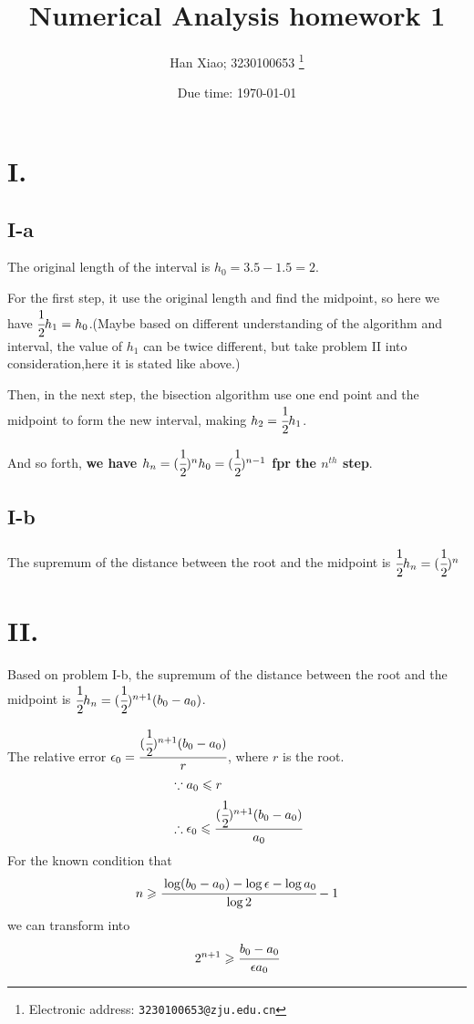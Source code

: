 \documentclass[a4paper]{article}
\begin{document}
\title{Numerical Analysis homework 1}

\author{Han Xiao; 3230100653
  \thanks{Electronic address: \texttt{3230100653@zju.edu.cn}}}


\date{Due time: \today}

\maketitle


\section*{I.}

\subsection*{I-a}
The original length of the interval is $h_0 = 3.5 - 1.5 = 2$.

For the first step, it use the original length and find the midpoint, so here we have $\cfrac{1}{2}h_1 = h_0$.(Maybe based on different understanding of the algorithm and interval, the value of $h_1$ can be twice different, but take problem II into consideration,here it is stated like above.)

Then, in the next step, the bisection algorithm use one end point and the midpoint to form the new interval, making $h_2 = \cfrac{1}{2}h_1$.

And so forth, \textbf{we have $h_n = (\cfrac{1}{2})^{n}h_0 = (\cfrac{1}{2})^{n-1}$ fpr the $n^{th}$ step}.

\subsection*{I-b}
The supremum of the distance between the root and the midpoint is $\cfrac{1}{2}h_n = (\cfrac{1}{2})^{n}$

\section*{II.}
Based on problem I-b, the supremum of the distance between the root and the midpoint is $\cfrac{1}{2}h_n = (\cfrac{1}{2})^{n+1}(b_0 - a_0)$.

The relative error $\epsilon_0 = \cfrac{(\cfrac{1}{2})^{n+1}(b_0 - a_0)}{r}$, where $r$ is the root.
\begin{align*}
&\because a_0 \leqslant r \\
&\therefore \epsilon_0 \leqslant \cfrac{(\cfrac{1}{2})^{n+1}(b_0 - a_0)}{a_0}\\
\end{align*}
For the known condition that 
\[
n \geqslant \cfrac{\log(b_0 - a_0) - \log\epsilon - \log{a_0}}{\log{2}} - 1
\]
we can transform into 
\[
2^{n+1} \geqslant \cfrac{b_0 - a_0}{\epsilon a_0}
\]
\end{document}
